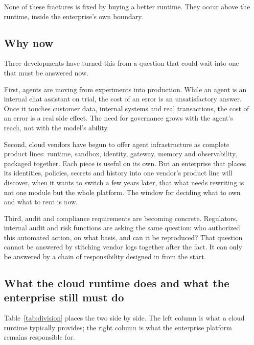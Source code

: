 None of these fractures is fixed by buying a better runtime. They occur above the runtime, inside the enterprise's own boundary.

\subsection{Why now}

Three developments have turned this from a question that could wait into one that must be answered now.

First, agents are moving from experiments into production. While an agent is an internal chat assistant on trial, the cost of an error is an unsatisfactory answer. Once it touches customer data, internal systems and real transactions, the cost of an error is a real side effect. The need for governance grows with the agent's reach, not with the model's ability.

Second, cloud vendors have begun to offer agent infrastructure as complete product lines: runtime, sandbox, identity, gateway, memory and observability, packaged together. Each piece is useful on its own. But an enterprise that places its identities, policies, secrets and history into one vendor's product line will discover, when it wants to switch a few years later, that what needs rewriting is not one module but the whole platform. The window for deciding what to own and what to rent is now.

Third, audit and compliance requirements are becoming concrete. Regulators, internal audit and risk functions are asking the same question: who authorized this automated action, on what basis, and can it be reproduced? That question cannot be answered by stitching vendor logs together after the fact. It can only be answered by a chain of responsibility designed in from the start.

\subsection{What the cloud runtime does and what the enterprise still must do}

Table~\ref{tab:division} places the two side by side. The left column is what a cloud runtime typically provides; the right column is what the enterprise platform remains responsible for.

